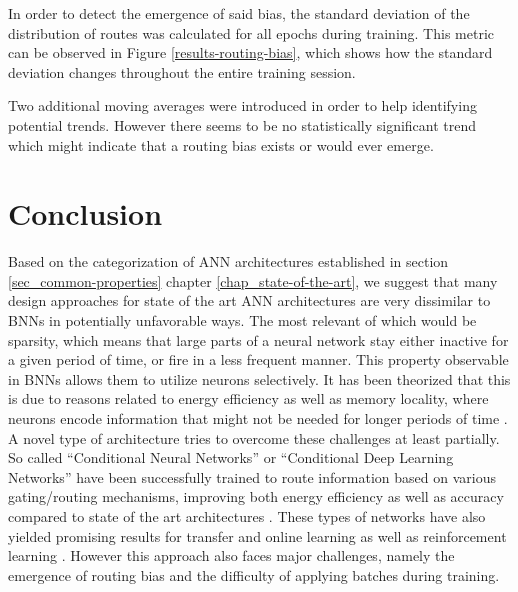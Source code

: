 In order to detect the emergence of said bias, the standard deviation
of the distribution of routes was calculated for all epochs during training.
This metric can be observed in Figure \ref{results-routing-bias}, which shows
how the standard deviation changes throughout the entire training session.

Two additional moving averages were introduced
in order to help identifying potential trends.
However there seems to be no statistically significant 
trend which might indicate that a routing bias exists or would ever emerge.


\clearpage


\chapter{Conclusion}
Based on the categorization of \acs{ANN} architectures 
established in section \ref{sec_common-properties} chapter \ref{chap_state-of-the-art}, we suggest that 
many design approaches for state of the art \acs{ANN} architectures
are very dissimilar to \acp{BNN} in potentially unfavorable ways.
The most relevant of which would be sparsity, which means that large parts of a neural network stay either inactive for a given period of time, or fire in a less frequent manner.
This property observable in \acp{BNN} allows them to utilize neurons selectively.
It has been theorized that this is due to reasons related to energy efficiency as well as memory locality, where neurons encode information that might not be needed for longer periods of time \cite{7_dorment-brain_2015}. 
A novel type of architecture tries to overcome these challenges at least partially.
So called “Conditional Neural Networks” or “Conditional Deep Learning Networks” have been successfully trained to route information based on various gating/routing mechanisms, improving both energy efficiency as well as accuracy compared to state of the art architectures \cite{8_CDL-4-efficient_2015}\cite{11_efficient-CDL_2017}\cite{12_dynamic-routing-in-ANNs_2017}.
These types of networks have also yielded promising results for
transfer and online learning \cite{31_continual-learning-2020} as well as reinforcement learning \cite{27_path-net-evolution}. 
However this approach also faces major challenges, namely the emergence of routing bias and the difficulty of applying batches during training. 


 
 